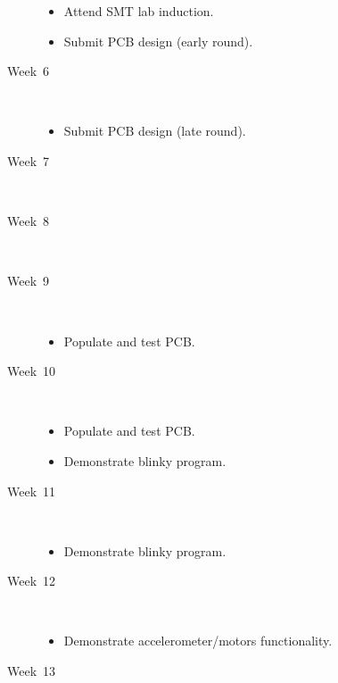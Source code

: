 \begin{description}
  \begin{itemize}
  \item Attend SMT lab induction.
  \item Submit PCB design (early round).
  \end{itemize}


\item [Week~6]\mbox{}\\

  \begin{itemize}
  \item Submit PCB design (late round).
  \end{itemize}


\item [Week~7]\mbox{}\\


\item [Week~8]\mbox{}\\

\item [Week~9]\mbox{}\\

  \begin{itemize}
  \item Populate and test PCB.
  \end{itemize}


\item [Week~10]\mbox{}\\

  \begin{itemize}
  \item Populate and test PCB.
  \item Demonstrate blinky program.
  \end{itemize}

\item [Week~11]\mbox{}\\

  \begin{itemize}
  \item Demonstrate blinky program.
  \end{itemize}

\item [Week~12]\mbox{}\\

  \begin{itemize}
  \item Demonstrate accelerometer/motors functionality.
  \end{itemize}

\item [Week~13]\mbox{}\\


\end{description}
